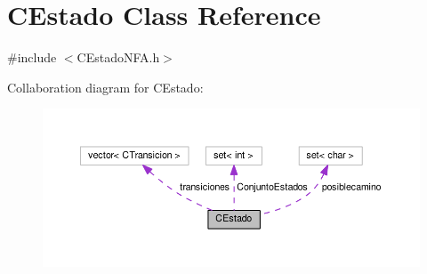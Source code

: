 \hypertarget{classCEstado}{}\section{C\+Estado Class Reference}
\label{classCEstado}


{\ttfamily \#include $<$C\+Estado\+N\+F\+A.\+h$>$}



Collaboration diagram for C\+Estado\+:
\nopagebreak
\begin{figure}[H]
\begin{center}
\leavevmode
\includegraphics[width=350pt]{classCEstado__coll__graph}
\end{center}
\end{figure}
